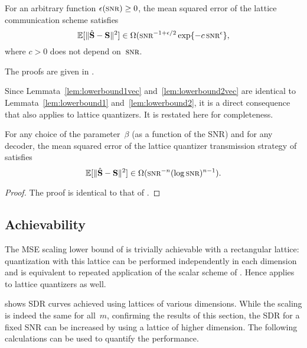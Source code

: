 \begin{lemma}
  \label{lem:lowerbound2vec}
  For an arbitrary function $\e(\snr) \ge 0$, the mean squared error of the
  lattice communication scheme satisfies
  \begin{equation*}
    \msev \in \Omega(\snr^{-1 + \e/2} \exp\{- c \snr^\e \},
  \end{equation*}
  where $c > 0$ does not depend on~$\snr$.
\end{lemma}

The proofs are given in .

Since Lemmata~\ref{lem:lowerbound1vec} and~\ref{lem:lowerbound2vec} are
identical to Lemmata~\ref{lem:lowerbound1} and~\ref{lem:lowerbound2}, it is a
direct consequence that  also applies to lattice quantizers.
It is restated here for completeness.

\begin{theorem}
  \label{thm:scalinglbvec}
  For any choice of the parameter~$\beta$ (as a function of the SNR) and for any
  decoder, the mean squared error of the lattice quantizer transmission strategy
  of  satisfies
  \begin{equation*}
    \msev \in \Omega(\snr^{-n} (\log\snr)^{n-1}).
  \end{equation*}
\end{theorem}

\begin{proof}
  The proof is identical to that of .
\end{proof}


\subsection{Achievability}

The MSE scaling lower bound of  is trivially achievable
with a rectangular lattice: quantization with this lattice can be performed
independently in each dimension and is equivalent to repeated application of the
scalar scheme of . Hence 
applies to lattice quantizers as well. 

 shows SDR curves achieved using lattices of various
dimensions. While the scaling is indeed the same for all~$m$, confirming the
results of this section, the SDR for a fixed SNR can be increased by using a
lattice of higher dimension. The following calculations can be used to quantify
the performance.

